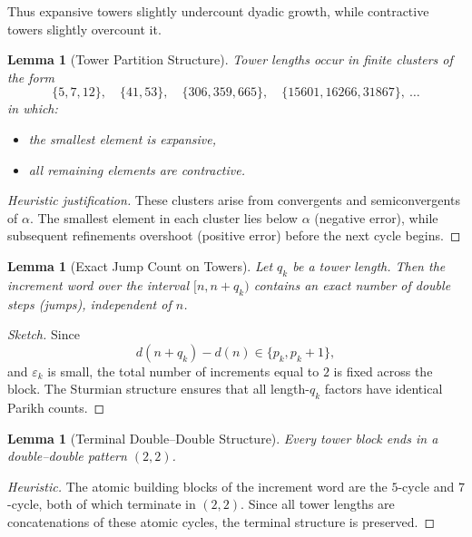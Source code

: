 \documentclass[12pt, oneside]{article}
\numberwithin{equation}{section}
\theoremstyle{definition}
\theoremstyle{plain}
\newtheorem{lemma}[theorem]{Lemma}
\theoremstyle{remark}
\begin{document}
Thus expansive towers slightly undercount dyadic growth, while
contractive towers slightly overcount it.


\begin{lemma}[Tower Partition Structure]
\label{lem:tower-partition}
Tower lengths occur in finite clusters of the form
\[
\{5,7,12\},\quad
\{41,53\},\quad
\{306,359,665\},\quad
\{15601,16266,31867\},\ \dots
\]
in which:
\begin{itemize}
\item the smallest element is expansive,
\item all remaining elements are contractive.
\end{itemize}
\end{lemma}

\begin{proof}[Heuristic justification]
These clusters arise from convergents and semiconvergents of $\alpha$.
The smallest element in each cluster lies below $\alpha$ (negative error),
while subsequent refinements overshoot (positive error) before the next
cycle begins.
\end{proof}


\begin{lemma}[Exact Jump Count on Towers]
\label{lem:exact-jumps}
Let $q_k$ be a tower length.  Then the increment word over the interval
$[n,n+q_k)$ contains an exact number of double steps (jumps), independent
of $n$.
\end{lemma}

\begin{proof}[Sketch]
Since
\[
d(n+q_k)-d(n) \in \{p_k, p_k+1\},
\]
and $\varepsilon_k$ is small, the total number of increments equal to $2$
is fixed across the block.  The Sturmian structure ensures that all
length-$q_k$ factors have identical Parikh counts.
\end{proof}


\begin{lemma}[Terminal Double--Double Structure]
\label{lem:dd-terminal}
Every tower block ends in a double--double pattern $(2,2)$.
\end{lemma}

\begin{proof}[Heuristic]
The atomic building blocks of the increment word are the $5$-cycle and
$7$-cycle, both of which terminate in $(2,2)$.  Since all tower lengths
are concatenations of these atomic cycles, the terminal structure is
preserved.
\end{proof}
\end{document}
